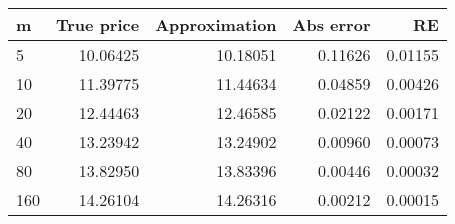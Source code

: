 \begin{tabular}{lrrrr}
\toprule
m &  True price &  Approximation &  Abs error &       RE \\
\midrule
5   &    10.06425 &       10.18051 &    0.11626 &  0.01155 \\
10  &    11.39775 &       11.44634 &    0.04859 &  0.00426 \\
20  &    12.44463 &       12.46585 &    0.02122 &  0.00171 \\
40  &    13.23942 &       13.24902 &    0.00960 &  0.00073 \\
80  &    13.82950 &       13.83396 &    0.00446 &  0.00032 \\
160 &    14.26104 &       14.26316 &    0.00212 &  0.00015 \\
\bottomrule
\end{tabular}
